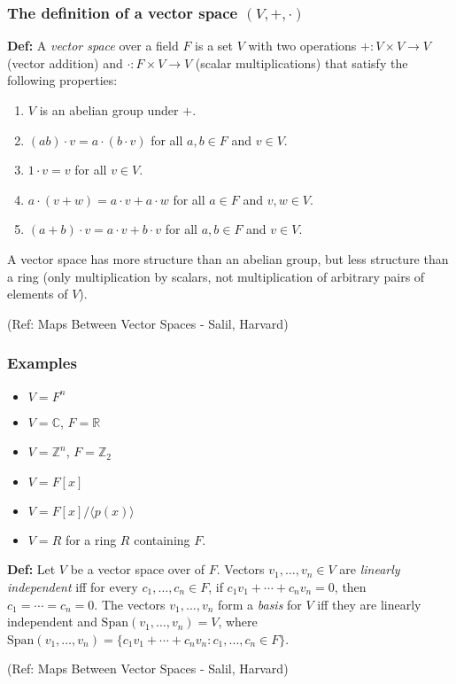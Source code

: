 \begin{frame}[fragile]
\frametitle{The definition of a vector space $(V, +, \cdot)$}
\textbf{Def:} A {\em vector space} over a field $F$ is a set $V$ with two operations $+ : V\times V\rightarrow V$ (vector addition) and $\cdot : F\times V\rightarrow V$ (scalar multiplications) that satisfy the following properties:

\begin{enumerate}
\item $V$ is an abelian group under $+$.
\item $(ab)\cdot v = a\cdot (b\cdot v)$ for all $a,b\in F$ and $v\in V$.
\item $1\cdot v=v$ for all $v\in V$.
\item $a\cdot (v+w) = a\cdot v+a\cdot w$ for all $a\in F$ and $v,w\in V$.
\item $(a+b)\cdot v = a\cdot v+b\cdot v$ for all $a,b\in F$ and $v\in V$.
\end{enumerate}

A vector space has more structure than an abelian group, but less structure than a ring (only multiplication by scalars, not multiplication of arbitrary pairs of elements of $V$).


\tiny{(Ref: Maps Between Vector Spaces - Salil, Harvard)}
\end{frame}


\begin{frame}[fragile]
\frametitle{Examples}

\begin{itemize}
\item $V=F^n$ 
\item $V={\mathbb C}$, $F={\mathbb R}$ 
\item $V={\mathbb Z}^n$, $F={\mathbb Z}_2$ 
\item $V=F[x]$ 
\item $V=F[x]/\langle p(x)\rangle$ 
\item $V=R$ for a ring $R$ containing $F$.
\end{itemize}

\textbf{Def:} Let $V$ be a vector space over of $F$.  Vectors $v_1,\ldots,v_n\in V$ are {\em linearly independent} iff for every $c_1,\ldots,c_n\in F$, if $c_1v_1+\cdots+c_nv_n=0$, then $c_1=\cdots=c_n=0$.  The vectors $v_1,\ldots,v_n$ form a {\em basis} for $V$ iff they are linearly independent and $\mathrm{Span}(v_1,\ldots,v_n)=V$, where $\mathrm{Span}(v_1,\ldots,v_n) = \{c_1v_1+\cdots+c_nv_n : c_1,\ldots,c_n\in F\}$.


\tiny{(Ref: Maps Between Vector Spaces - Salil, Harvard)}
\end{frame}

